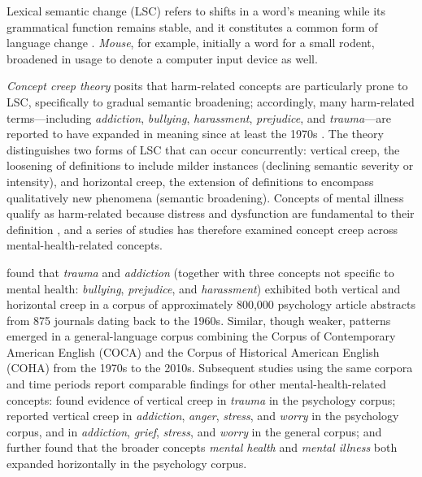 Lexical semantic change (LSC) refers to shifts in a word's meaning while its grammatical function remains stable, and it constitutes a common form of language change \citep{campbellHistoricalLinguisticsIntroduction2013}. \textit{Mouse}, for example, initially a word for a small rodent, broadened in usage to denote a computer input device as well.

\textit{Concept creep theory} posits that harm-related concepts are particularly prone to LSC, specifically to gradual semantic broadening; accordingly, many harm-related terms---including \textit{addiction}, \textit{bullying}, \textit{harassment}, \textit{prejudice}, and \textit{trauma}---are reported to have expanded in meaning since at least the 1970s \citep{haslamConceptCreepPsychologys2016,baesSemanticInflationTrauma2023}. The theory distinguishes two forms of LSC that can occur concurrently: vertical creep, the loosening of definitions to include milder instances (declining semantic severity or intensity), and horizontal creep, the extension of definitions to encompass qualitatively new phenomena (semantic broadening). Concepts of mental illness qualify as harm-related because distress and dysfunction are fundamental to their definition \citep{wakefieldConceptMentalDisorder1992}, and a series of studies has therefore examined concept creep across mental-health-related concepts.

\citet{vylomovaSemanticChangesHarmrelated2021} found that \textit{trauma} and \textit{addiction} (together with three concepts not specific to mental health: \textit{bullying}, \textit{prejudice}, and \textit{harassment}) exhibited both vertical and horizontal creep in a corpus of approximately 800,000 psychology article abstracts from 875 journals dating back to the 1960s. Similar, though weaker, patterns emerged in a general-language corpus combining the Corpus of Contemporary American English (COCA) and the Corpus of Historical American English (COHA) from the 1970s to the 2010s. Subsequent studies using the same corpora and time periods report comparable findings for other mental-health-related concepts: \citet{baesSemanticInflationTrauma2023} found evidence of vertical creep in \textit{trauma} in the psychology corpus; \citet{baesSemanticShiftsMental2023} reported vertical creep in \textit{addiction}, \textit{anger}, \textit{stress}, and \textit{worry} in the psychology corpus, and in \textit{addiction}, \textit{grief}, \textit{stress}, and \textit{worry} in the general corpus; and \citet{baesMultidimensionalFrameworkEvaluating2024} further found that the broader concepts \textit{mental health} and \textit{mental illness} both expanded horizontally in the psychology corpus.

